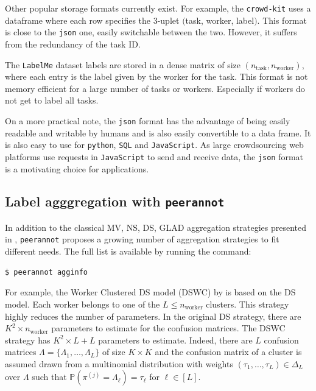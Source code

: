 Other popular storage formats currently exist.
For example, the \texttt{crowd-kit} \citep{CrowdKit2023} uses a dataframe where each row specifies the $3$-uplet $($task, worker, label$)$.
This format is close to the \texttt{json} one, easily switchable between the two. However, it suffers from the redundancy of the task ID.

The \texttt{LabelMe} dataset labels are stored in a dense matrix of size $(n_{\text{task}}, n_{\text{worker}})$, where each entry is the label given by the worker for the task. This format is not memory efficient for a large number of tasks or workers. Especially if workers do not get to label all tasks.

On a more practical note, the \texttt{json} format has the advantage of being easily readable and writable by humans and is also easily convertible to a data frame. It is also easy to use for \texttt{python}, \texttt{SQL} and \texttt{JavaScript}.
As large crowdsourcing web platforms use requests in \texttt{JavaScript} to send and receive data, the \texttt{json} format is a motivating choice for applications.

\subsection{Label agggregation with \texttt{peerannot}}

In addition to the classical MV, NS, DS, GLAD aggregation strategies presented in , \texttt{peerannot} proposes a growing number of aggregation strategies to fit different needs.
The full list is available by running the command:

\begin{verbatim}
$ peerannot agginfo
\end{verbatim}


For example, the Worker Clustered DS model (DSWC) by \citet{imamura2018analysis} is based on the DS model.
Each worker belongs to one of the $L\leq n_{\text{worker}}$ clusters.
This strategy highly reduces the number of parameters.
In the original DS strategy, there are $K^2\times n_{\text{worker}}$ parameters to estimate for the confusion matrices. The DSWC strategy has $K^2\times L + L$ parameters to estimate.
Indeed, there are $L$ confusion matrices $\Lambda=\{\Lambda_1,\dots,\Lambda_L\}$ of size $K\times K$ and the confusion matrix of a cluster is assumed drawn from a multinomial distribution with weights $(\tau_1,\dots,\tau_L)\in\Delta_L$ over $\Lambda$ such that $\mathbb{P}(\pi^{(j)}=\Lambda_\ell)=\tau_\ell$ for $\ell \in [L]$.

